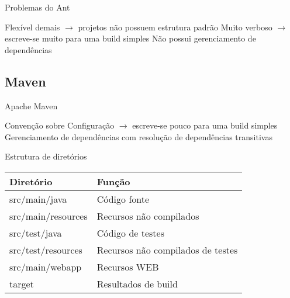 \documentclass{beamer}
\begin{document}
\begin{frame}{Problemas do Ant}
 \begin{outline}
    Flexível demais $\rightarrow$ projetos não possuem estrutura padrão
    Muito verboso $\rightarrow$ escreve-se muito para uma build simples
    Não possui gerenciamento de dependências
 \end{outline}
\end{frame}

\subsection{Maven}

\begin{frame}{Apache Maven}
 \begin{outline}
    Convenção sobre Configuração $\rightarrow$ escreve-se pouco para uma build simples
    Gerenciamento de dependências com resolução de dependências transitivas
 \end{outline}
\end{frame}

\begin{frame}{Estrutura de diretórios}
 \begin{table}[]
    \begin{tabular}{@{}ll@{}}
      \toprule
      Diretório           & Função                            \\ \midrule
      src/main/java       & Código fonte                      \\
      src/main/resources  & Recursos não compilados           \\
      src/test/java       & Código de testes                  \\
      src/test/resources  & Recursos não compilados de testes \\
      src/main/webapp     & Recursos WEB                      \\
      target              & Resultados de build               \\ \bottomrule
    \end{tabular}
  \end{table}
\end{frame}
\end{document}
